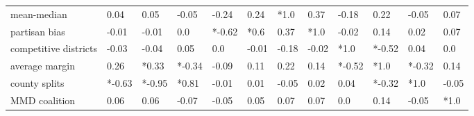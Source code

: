 \begin{tabular}{llllllllllll}
mean-median           &    0.04 &                        0.05 &                   -0.05 &                   -0.24 &                         0.24 &                      *1.0 &                        0.37 &                               -0.18 &                         0.22 &                       -0.05 &                        0.07 \\
partisan bias         &   -0.01 &                       -0.01 &                     0.0 &                  *-0.62 &                         *0.6 &                      0.37 &                        *1.0 &                               -0.02 &                         0.14 &                        0.02 &                        0.07 \\
competitive districts &   -0.03 &                       -0.04 &                    0.05 &                     0.0 &                        -0.01 &                     -0.18 &                       -0.02 &                                *1.0 &                       *-0.52 &                        0.04 &                         0.0 \\
average margin        &    0.26 &                       *0.33 &                  *-0.34 &                   -0.09 &                         0.11 &                      0.22 &                        0.14 &                              *-0.52 &                         *1.0 &                      *-0.32 &                        0.14 \\
county splits         &  *-0.63 &                      *-0.95 &                   *0.81 &                   -0.01 &                         0.01 &                     -0.05 &                        0.02 &                                0.04 &                       *-0.32 &                        *1.0 &                       -0.05 \\
MMD coalition         &    0.06 &                        0.06 &                   -0.07 &                   -0.05 &                         0.05 &                      0.07 &                        0.07 &                                 0.0 &                         0.14 &                       -0.05 &                        *1.0 \\
\bottomrule
\end{tabular}
